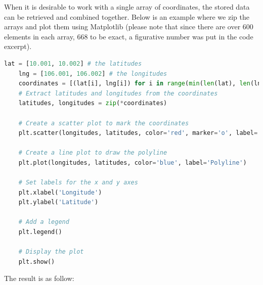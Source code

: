 When it is desirable to work with a single array of coordinates, the stored data can be retrieved and combined together. Below is an example where we zip the arrays and plot them using Matplotlib (please note that since there are over 600 elements in each array, 668 to be exact, a figurative number was put in the code excerpt).

\begin{lstlisting}[language=python]
    lat = [10.001, 10.002] # the latitudes
    lng = [106.001, 106.002] # the longitudes
    coordinates = [(lat[i], lng[i]) for i in range(min(len(lat), len(lng)))]
    # Extract latitudes and longitudes from the coordinates
    latitudes, longitudes = zip(*coordinates)
    
    # Create a scatter plot to mark the coordinates
    plt.scatter(longitudes, latitudes, color='red', marker='o', label='Coordinates')
    
    # Create a line plot to draw the polyline
    plt.plot(longitudes, latitudes, color='blue', label='Polyline')
    
    # Set labels for the x and y axes
    plt.xlabel('Longitude')
    plt.ylabel('Latitude')
    
    # Add a legend
    plt.legend()
    
    # Display the plot
    plt.show()
\end{lstlisting}

The result is as follow:
\begin{figure}[H]
    \centering
    \hspace{0.5cm} %
\end{figure}

